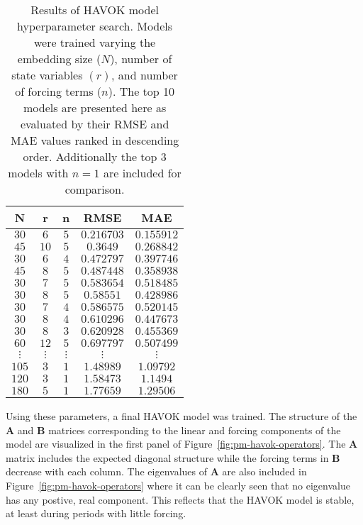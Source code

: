 \begin{table}[h]
  \caption{Results of HAVOK model hyperparameter search. Models were trained
    varying the embedding size ($N$), number of state variables $(r)$, and
    number of forcing terms ($n$). The top 10 models are presented here as
    evaluated by their RMSE and MAE values ranked in descending order.
    Additionally the top 3 models with $n=1$ are included for comparison.}
  \label{tab:havok-fit-results}
  \centering
  \begin{tabular}{ccccc} \hline
    \textbf{N} & \textbf{r} & \textbf{n} & \textbf{RMSE}  & \textbf{MAE} \\ \hline
    $30$ & $6$ & $5$ & $0.216703$ & $0.155912$ \\
    $45$ & $10$ & $5$ & $0.3649$ & $0.268842$ \\
    $30$ & $6$ & $4$ & $0.472797$ & $0.397746$ \\
    $45$ & $8$ & $5$ & $0.487448$ & $0.358938$ \\
    $30$ & $7$ & $5$ & $0.583654$ & $0.518485$ \\
    $30$ & $8$ & $5$ & $0.58551$ & $0.428986$ \\
    $30$ & $7$ & $4$ & $0.586575$ & $0.520145$ \\
    $30$ & $8$ & $4$ & $0.610296$ & $0.447673$ \\
    $30$ & $8$ & $3$ & $0.620928$ & $0.455369$ \\
    $60$ & $12$ & $5$ & $0.697797$ & $0.507499$ \\
    $\vdots$ & $\vdots$ & $\vdots$ & $\vdots$ & $\vdots$ \\
    $105$ & $3$ & $1$ & $1.48989$ & $1.09792$  \\
    $120$ & $3$ & $1$ &  $1.58473$ & $1.1494$ \\
    $180$ & $5$ & $1$ & $1.77659$ & $1.29506$
  \end{tabular}
\end{table}


Using these parameters, a final HAVOK model was trained. The structure of the
$\mathbf{A}$ and $\mathbf{B}$ matrices corresponding to the linear and forcing
components of the model are visualized in the first panel of
Figure~\ref{fig:pm-havok-operators}. The $\mathbf{A}$ matrix includes the
expected diagonal structure while the forcing terms in $\mathbf{B}$ decrease
with each column. The eigenvalues of $\mathbf{A}$ are also included in
Figure~\ref{fig:pm-havok-operators} where it can be clearly seen that no
eigenvalue has any postive, real component. This reflects that the HAVOK model
is stable, at least during periods with little forcing.

